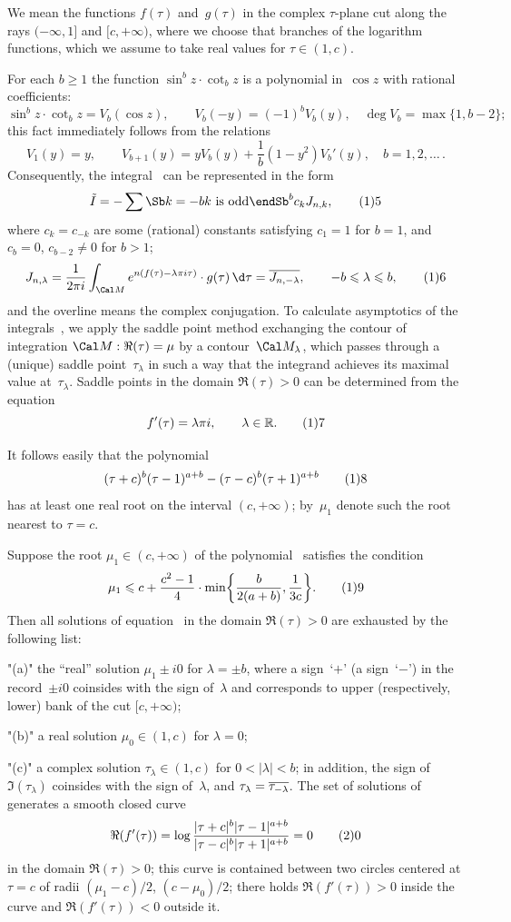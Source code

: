 We mean the functions $f(\tau)$ and~$g(\tau)$
in the complex $\tau$-plane cut along
the rays $(-\infty,1]$ and $[c,+\infty)$, where
we choose that branches of the logarithm functions,
which we assume to take real values for $\tau\in(1,c)$.

For each $b\ge1$ the function $\sin^bz\cdot\cot_bz$
is a polynomial in~$\cos z$ with rational coefficients:
$$
\sin^bz\cdot\cot_bz=V_b(\cos z),
\qquad V_b(-y)=(-1)^bV_b(y), \quad \deg V_b=\max\{1,b-2\};
$$
this fact immediately follows from the relations
$$
V_1(y)=y, \qquad
V_{b+1}(y)=yV_b(y)+\frac1b(1-y^2)V_b'(y), \quad b=1,2,\dots\,.
$$
Consequently, the integral~ can be represented in the form
$$
\tilde I=-\sum\Sb k=-b\\\text{$k$ is odd}\endSb^bc_kJ_{n,k},
\tag15
$$
where $c_k=c_{-k}$ are some (rational) constants
satisfying $c_1=1$ for $b=1$, and $c_b=0$, $c_{b-2}\ne0$ for $b>1$;
$$
J_{n,\lambda}
=\frac1{2\pi i}\int_{\Cal M}e^{n(f(\tau)-\lambda\pi i\tau)}
\cdot g(\tau)\,\d\tau
=\ol{J_{n,-\lambda}},
\qquad -b\le\lambda\le b,
\tag16
$$
and the overline means the complex conjugation.
To calculate asymptotics of the integrals~,
we apply the saddle point method exchanging the contour of integration
$\Cal M:\Re(\tau)=\mu$ by a contour~$\Cal M_\lambda$,
which passes through a (unique) saddle point~$\tau_\lambda$
in such a way that the integrand
achieves its maximal value at~$\tau_\lambda$. Saddle points
in the domain $\Re(\tau)>0$ can be determined from the equation
$$
f'(\tau)=\lambda\pi i, \qquad \lambda\in\Bbb R.
\tag17
$$

It follows easily that the polynomial
$$
(\tau+c)^b(\tau-1)^{a+b}-(\tau-c)^b(\tau+1)^{a+b}
\tag18
$$
has at least one real root on the interval $(c,+\infty)$;
by~$\mu_1$ denote such the root nearest to $\tau=c$.

Suppose the root $\mu_1\in(c,+\infty)$ of the polynomial~
satisfies the condition
$$
\mu_1
\le c+\frac{c^2-1}4\cdot\min\biggl\{\frac b{2(a+b)},\frac1{3c}\biggr\}.
\tag19
$$
Then all solutions of equation~
in the domain $\Re(\tau)>0$ are exhausted by the
following list\rom:
\roster
\item"(a)" the ``real'' solution $\mu_1\pm i0$ for $\lambda=\pm b$\rom,
where a sign~`$+$' \rom(a sign~`$-$'\rom) in the record~$\pm i0$ coinsides
with the sign of~$\lambda$ and corresponds to upper
\rom(respectively\rom, lower\rom) bank of the cut $[c,+\infty)$\rom;
\item"(b)" a real solution $\mu_0\in(1,c)$ for $\lambda=0$\rom;
\item"(c)" a complex solution $\tau_\lambda\in(1,c)$ for
$0<|\lambda|<b$\rom; in addition\rom, the sign of~$\Im(\tau_\lambda)$
coinsides with the sign of~$\lambda$\rom,
and $\tau_\lambda=\overline{\tau_{-\lambda}}$.
\endroster
The set of solutions of~ generates a smooth closed curve
$$
\Re(f'(\tau))
=\log\frac{|\tau+c|^b|\tau-1|^{a+b}}{|\tau-c|^b|\tau+1|^{a+b}}
=0
\tag20
$$
in the domain $\Re(\tau)>0$\rom; this curve is contained between
two circles centered at $\tau=c$
of radii $(\mu_1-c)/2$\rom, $(c-\mu_0)/2$\rom;
there holds $\Re(f'(\tau))>0$ inside the curve
and $\Re(f'(\tau))<0$ outside it.
\endproclaim

